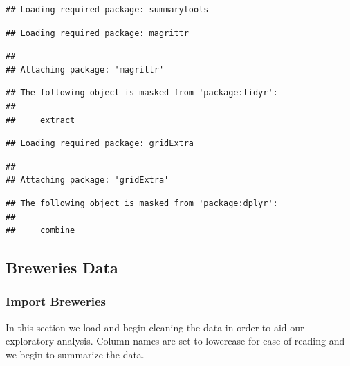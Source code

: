 \documentclass[]{article}
\newenvironment{Shaded}{\begin{snugshade}}{\end{snugshade}}
\newcommand{\KeywordTok}[1]{\textcolor[rgb]{0.13,0.29,0.53}{\textbf{#1}}}
\newcommand{\DataTypeTok}[1]{\textcolor[rgb]{0.13,0.29,0.53}{#1}}
\newcommand{\StringTok}[1]{\textcolor[rgb]{0.31,0.60,0.02}{#1}}
\newcommand{\CommentTok}[1]{\textcolor[rgb]{0.56,0.35,0.01}{\textit{#1}}}
\newcommand{\OtherTok}[1]{\textcolor[rgb]{0.56,0.35,0.01}{#1}}
\newcommand{\OperatorTok}[1]{\textcolor[rgb]{0.81,0.36,0.00}{\textbf{#1}}}
\newcommand{\NormalTok}[1]{#1}
\begin{document}
\begin{verbatim}
## Loading required package: summarytools
\end{verbatim}

\begin{verbatim}
## Loading required package: magrittr
\end{verbatim}

\begin{verbatim}
## 
## Attaching package: 'magrittr'
\end{verbatim}

\begin{verbatim}
## The following object is masked from 'package:tidyr':
## 
##     extract
\end{verbatim}

\begin{verbatim}
## Loading required package: gridExtra
\end{verbatim}

\begin{verbatim}
## 
## Attaching package: 'gridExtra'
\end{verbatim}

\begin{verbatim}
## The following object is masked from 'package:dplyr':
## 
##     combine
\end{verbatim}

\subsection{Breweries Data}\label{breweries-data}

\subsubsection{Import Breweries}\label{import-breweries}

In this section we load and begin cleaning the data in order to aid our
exploratory analysis. Column names are set to lowercase for ease of
reading and we begin to summarize the data.

\begin{Shaded}
\end{Shaded}
\end{document}
